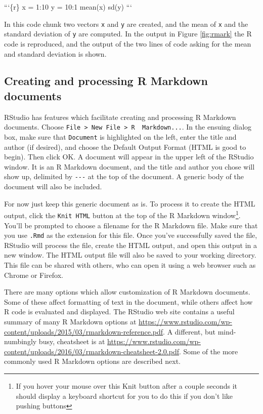 \documentclass[]{krantz}
\makeatletter
\newenvironment{Shaded}{\begin{snugshade}}{\end{snugshade}}
\newcommand{\DataTypeTok}[1]{\textcolor[rgb]{0.27,0.27,0.27}{#1}}
\newcommand{\StringTok}[1]{\textcolor[rgb]{0.5,0.5,0.5}{#1}}
\newenvironment{kframe}{%
\medskip{}
\setlength{\fboxsep}{.8em}
 \def\at@end@of@kframe{}%
 \ifinner\ifhmode%
  \def\at@end@of@kframe{\end{minipage}}%
  \begin{minipage}{\columnwidth}%
 \fi\fi%
 \def\FrameCommand##1{\hskip\@totalleftmargin \hskip-\fboxsep
 \colorbox{shadecolor}{##1}\hskip-\fboxsep
     \hskip-\linewidth \hskip-\@totalleftmargin \hskip\columnwidth}%
 \MakeFramed {\advance\hsize-\width
   \@totalleftmargin\z@ \linewidth\hsize
   \@setminipage}}%
 {\par\unskip\endMakeFramed%
 \at@end@of@kframe}
\renewenvironment{Shaded}{\begin{kframe}}{\end{kframe}}
\theoremstyle{definition}
\theoremstyle{definition}
\theoremstyle{definition}
\theoremstyle{remark}
\makeatother
\begin{document}
\begin{Shaded}
\begin{Highlighting}[]
\StringTok{```}\DataTypeTok{\{r\}}
\DataTypeTok{x = 1:10}
\DataTypeTok{y = 10:1}
\DataTypeTok{mean(x)}
\DataTypeTok{sd(y)}
\StringTok{```}
\end{Highlighting}
\end{Shaded}

In this code chunk two vectors \texttt{x} and \texttt{y} are created,
and the mean of \texttt{x} and the standard deviation of \texttt{y} are
computed. In the output in Figure \ref{fig:rmark} the R code is
reproduced, and the output of the two lines of code asking for the mean
and standard deviation is shown.

\subsection{Creating and processing R Markdown
documents}\label{creating-and-processing-r-markdown-documents}

RStudio has features which facilitate creating and processing R Markdown
documents. Choose
\texttt{File\ \textgreater{}\ New\ File\ \textgreater{}\ R\ \ Markdown...}.
In the ensuing dialog box, make sure that \texttt{Document} is
highlighted on the left, enter the title and author (if desired), and
choose the Default Output Format (HTML is good to begin). Then click OK.
A document will appear in the upper left of the RStudio window. It is an
R Markdown document, and the title and author you chose will show up,
delimited by \texttt{-\/-\/-} at the top of the document. A generic body
of the document will also be included.

For now just keep this generic document as is. To process it to create
the HTML output, click the \texttt{Knit\ HTML} button at the top of the
R Markdown window\footnote{If you hover your mouse over this Knit button
  after a couple seconds it should display a keyboard shortcut for you
  to do this if you don't like pushing buttons}. You'll be prompted to
choose a filename for the R Markdown file. Make sure that you use
\texttt{.Rmd} as the extension for this file. Once you've successfully
saved the file, RStudio will process the file, create the HTML output,
and open this output in a new window. The HTML output file will also be
saved to your working directory. This file can be shared with others,
who can open it using a web browser such as Chrome or Firefox.

There are many options which allow customization of R Markdown
documents. Some of these affect formatting of text in the document,
while others affect how R code is evaluated and displayed. The RStudio
web site contains a useful summary of many R Markdown options at
\url{https://www.rstudio.com/wp-content/uploads/2015/03/rmarkdown-reference.pdf}.
A different, but mind-numbingly busy, cheatsheet is at
\url{https://www.rstudio.com/wp-content/uploads/2016/03/rmarkdown-cheatsheet-2.0.pdf}.
Some of the more commonly used R Markdown options are described next.
\end{document}
